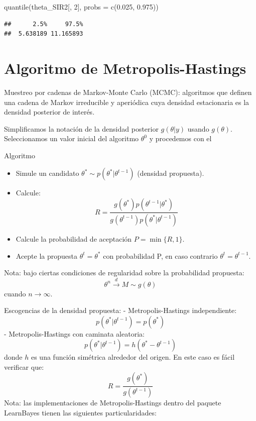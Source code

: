 \documentclass[
  12pt,
]{book}
\newenvironment{Shaded}{\begin{snugshade}}{\end{snugshade}}
\newcommand{\AttributeTok}[1]{\textcolor[rgb]{0.77,0.63,0.00}{#1}}
\newcommand{\DecValTok}[1]{\textcolor[rgb]{0.00,0.00,0.81}{#1}}
\newcommand{\FloatTok}[1]{\textcolor[rgb]{0.00,0.00,0.81}{#1}}
\newcommand{\FunctionTok}[1]{\textcolor[rgb]{0.00,0.00,0.00}{#1}}
\newcommand{\NormalTok}[1]{#1}
\providecommand{\tightlist}{%
  \setlength{\itemsep}{0pt}\setlength{\parskip}{0pt}}
\theoremstyle{definition}
\theoremstyle{definition}
\theoremstyle{definition}
\theoremstyle{definition}
\theoremstyle{remark}
\begin{document}
\begin{Shaded}
\begin{Highlighting}[]
\FunctionTok{quantile}\NormalTok{(theta\_SIR2[, }\DecValTok{2}\NormalTok{], }\AttributeTok{probs =} \FunctionTok{c}\NormalTok{(}\FloatTok{0.025}\NormalTok{, }\FloatTok{0.975}\NormalTok{))}
\end{Highlighting}
\end{Shaded}

\begin{verbatim}
##      2.5%     97.5% 
##  5.638189 11.165893
\end{verbatim}

\hypertarget{algoritmo-de-metropolis-hastings}{%
\section{Algoritmo de Metropolis-Hastings}\label{algoritmo-de-metropolis-hastings}}

Muestreo por cadenas de Markov-Monte Carlo (MCMC): algoritmos que definen una cadena de Markov irreducible y aperiódica cuya densidad estacionaria es la densidad posterior de interés.

Simplificamos la notación de la densidad posterior \(g(\theta|y)\) usando \(g(\theta)\). Seleccionamos un valor inicial del algoritmo \(\theta^0\) y procedemos con el

Algoritmo

\begin{itemize}
\tightlist
\item
  Simule un candidato \(\theta^*\sim p(\theta^*|\theta^{t-1})\) (densidad propuesta).
\item
  Calcule:
  \[R=\frac{g(\theta^*)p(\theta^{t-1}|\theta^*)}{g(\theta^{t-1})p(\theta^*|\theta^{t-1})}\]
\item
  Calcule la probabilidad de aceptación \(P=\min \{R,1\}\).
\item
  Acepte la propuesta \(\theta^{t}=\theta^*\) con probabilidad P, en caso contrario \(\theta^t=\theta^{t-1}\).
\end{itemize}

Nota: bajo ciertas condiciones de regularidad sobre la probabilidad propuesta:
\[\theta^n \stackrel{d}{\longrightarrow} M\sim g(\theta)\]
cuando \(n\rightarrow \infty\).

Escogencias de la densidad propuesta:
- Metropolis-Hastings independiente:
\[p(\theta^*|\theta^{t-1})=p(\theta^*)\]
- Metropolis-Hastings con caminata aleatoria:
\[p(\theta^*|\theta^{t-1})=h(\theta^*-\theta^{t-1})\]
donde \(h\) es una función simétrica alrededor del origen. En este caso es fácil verificar que:
\[R=\frac{g(\theta^*)}{g(\theta^{t-1})}\]
Nota: las implementaciones de Metropolis-Hastings dentro del paquete LearnBayes tienen las siguientes particularidades:
\end{document}
